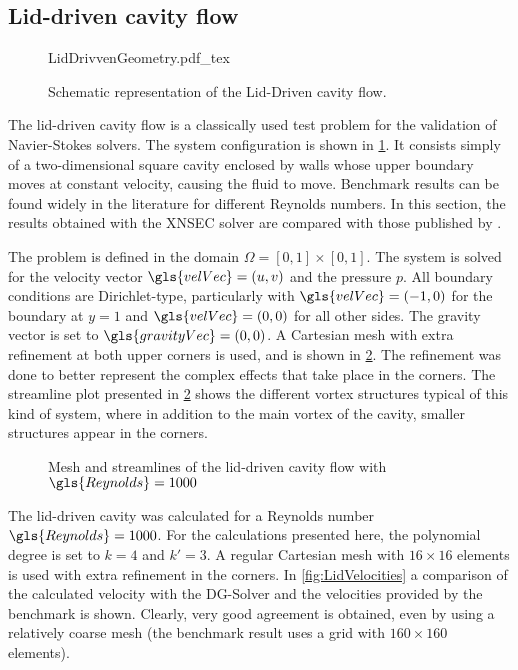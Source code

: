 \subsection{Lid-driven cavity flow}

\begin{figure}[t]
	\begin{center}
		\def\svgwidth{0.3\textwidth}
		{LidDrivvenGeometry.pdf_tex}
		\caption{Schematic representation of the Lid-Driven cavity flow.}
		\label{fig:LidDrivenCavity}
	\end{center}
\end{figure}

The lid-driven cavity flow is a classically used test problem for the validation of Navier-Stokes solvers. The system configuration is shown in \cref{fig:LidDrivenCavity}. It consists simply of a two-dimensional square cavity enclosed by walls whose upper boundary moves at constant velocity, causing the fluid to move. Benchmark results can be found widely in the literature for different Reynolds numbers. In this section, the results obtained with the XNSEC solver are compared with those published by \textcite{botellaBenchmarkSpectralResults1998}. 

The problem is defined in the domain $\Omega = [0,1]\times [0,1]$. The system is solved for the velocity vector $\gls{velVec} = (u,v)$ and the pressure $p$. All boundary conditions are Dirichlet-type, particularly with $\gls{velVec} = (-1,0)$ for the boundary at $y = 1$ and $\gls{velVec} = (0,0)$ for all other sides. The gravity vector is set to $\gls{gravityVec} = (0,0)$.
A Cartesian mesh with extra refinement at both upper corners is used, and is shown in \cref{fig:LiddrivenMesh}. The refinement was done to better represent the complex effects that take place in the corners. The streamline plot presented in \cref{fig:LiddrivenMesh} shows the different vortex structures typical of this kind of system, where in addition to the main vortex of the cavity, smaller structures appear in the corners.

\begin{figure}[b]
	\centering
	\pgfplotsset{width=0.35 \textwidth, compat=1.3}
	\caption{Mesh and streamlines of the lid-driven cavity flow with $\gls{Reynolds} = 1000$} \label{fig:LiddrivenMesh}
\end{figure}

The lid-driven cavity was calculated for a Reynolds number $\gls{Reynolds} = 1000$. For the calculations presented here, the polynomial degree is set to $k = 4$ and $k' = 3$. A regular Cartesian mesh with $16\times16$ elements is used with extra refinement in the corners. In \cref{fig:LidVelocities} a comparison of the calculated velocity with the DG-Solver and the velocities provided by the benchmark is shown. Clearly, very good agreement is obtained, even by using a relatively coarse mesh (the benchmark result uses a grid with $160\times160$ elements).

